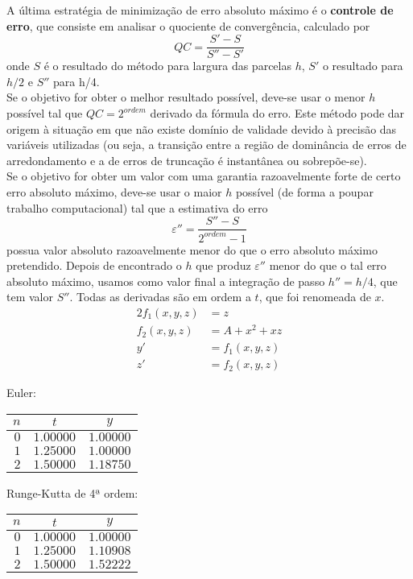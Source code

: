 {A última estratégia de minimização de erro absoluto máximo é o \textbf{controle de erro}, que consiste em analisar o quociente de convergência, calculado por
\begin{equation*}
	QC=\frac{S'-S}{S''-S'}
\end{equation*}
onde $S$ é o resultado do método para largura das parcelas $h$, $S'$ o resultado para $h/2$ e $S''$ para h/4.\\ Se o objetivo for obter o melhor resultado possível, deve-se usar o menor $h$ possível tal que $QC = 2^{ordem}$ derivado da fórmula do erro. Este método pode dar origem à situação em que não existe domínio de validade devido à precisão das variáveis utilizadas (ou seja, a transição entre a região de dominância de erros de arredondamento e a de erros de truncação é instantânea ou sobrepõe-se).\\
Se o objetivo for obter um valor com uma garantia razoavelmente forte de certo erro absoluto máximo, deve-se usar o maior $h$ possível (de forma a poupar trabalho computacional) tal que a estimativa do erro
\begin{equation*}
\varepsilon '' = \frac{S''-S}{2^{ordem}-1}
\end{equation*}
possua valor absoluto razoavelmente menor do que o erro absoluto máximo pretendido. Depois de encontrado o $h$ que produz $\varepsilon ''$ menor do que o tal erro absoluto máximo, usamos como valor final a integração de passo $h''=h/4$, que tem valor $S''$.
Todas as derivadas são em ordem a $t$, que foi renomeada de $x$.
\begin{alignat*}{2}
	f_1(x,y,z)&=z\\	
	f_2(x,y,z)&=A+x^2+xz\\	
	y'&=f_1(x,y,z)\\	
	z'&=f_2(x,y,z)
\end{alignat*}
%
\begin{center}
\begin{minipage}[c]{0.5\textwidth}
\begin{center} Euler:\\ \begin{tabular}{r | c c}
	$n$ & $t$ & $y$ \\ \hline
	$0$ & $1.00000$ & $1.00000$ \\
	$1$ & $1.25000$ & $1.00000$ \\
	$2$ & $1.50000$ & $1.18750$
\end{tabular} \end{center}
\end{minipage}%
\begin{minipage}[c]{0.5\textwidth}
\begin{center} Runge-Kutta de 4ª ordem:\\ \begin{tabular}{r | c c}
	$n$ & $t$ & $y$ \\ \hline
	$0$ & $1.00000$ & $1.00000$ \\
	$1$ & $1.25000$ & $1.10908$ \\
	$2$ & $1.50000$ & $1.52222$
\end{tabular} \end{center}
\end{minipage}
\end{center}
}